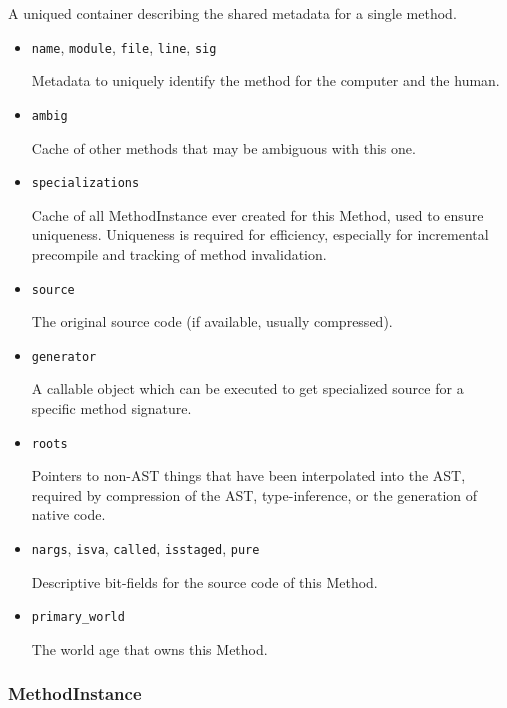 A unique{\textquotesingle}d container describing the shared metadata for a single method.



\begin{itemize}
\item \texttt{name}, \texttt{module}, \texttt{file}, \texttt{line}, \texttt{sig}

Metadata to uniquely identify the method for the computer and the human.


\item \texttt{ambig}

Cache of other methods that may be ambiguous with this one.


\item \texttt{specializations}

Cache of all MethodInstance ever created for this Method, used to ensure uniqueness. Uniqueness is required for efficiency, especially for incremental precompile and tracking of method invalidation.


\item \texttt{source}

The original source code (if available, usually compressed).


\item \texttt{generator}

A callable object which can be executed to get specialized source for a specific method signature.


\item \texttt{roots}

Pointers to non-AST things that have been interpolated into the AST, required by compression of the AST, type-inference, or the generation of native code.


\item \texttt{nargs}, \texttt{isva}, \texttt{called}, \texttt{isstaged}, \texttt{pure}

Descriptive bit-fields for the source code of this Method.


\item \texttt{primary\_world}

The world age that {\textquotedbl}owns{\textquotedbl} this Method.

\end{itemize}


\hypertarget{2584833319372808594}{}


\subsubsection{MethodInstance}



